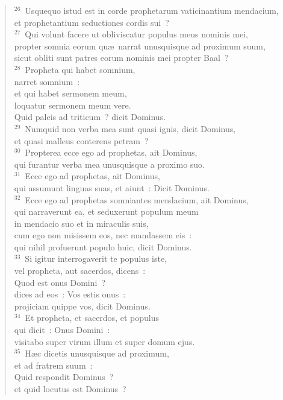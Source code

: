 \begin{flushleft}
\begin{verse}
${}^{26}$~Usquequo istud est in corde prophetarum vaticinantium mendacium,\\ et prophetantium seductiones cordis sui~?\\
${}^{27}$~Qui volunt facere ut obliviscatur populus meus nominis mei,\\ propter somnia eorum qu\ae\ narrat unusquisque ad proximum suum,\\ sicut obliti sunt patres eorum nominis mei propter Baal~?\\
${}^{28}$~Propheta qui habet somnium,\\ narret somnium~:\\ et qui habet sermonem meum,\\ loquatur sermonem meum vere.\\ Quid paleis ad triticum~? dicit Dominus.\\
${}^{29}$~Numquid non verba mea sunt quasi ignis, dicit Dominus,\\ et quasi malleus conterens petram~?\\
${}^{30}$~Propterea ecce ego ad prophetas, ait Dominus,\\ qui furantur verba mea unusquisque a proximo suo.\\
${}^{31}$~Ecce ego ad prophetas, ait Dominus,\\ qui assumunt linguas suas, et aiunt~: Dicit Dominus.\\
${}^{32}$~Ecce ego ad prophetas somniantes mendacium, ait Dominus,\\ qui narraverunt ea, et seduxerunt populum meum\\ in mendacio suo et in miraculis suis,\\ cum ego non misissem eos, nec mandassem eis~:\\ qui nihil profuerunt populo huic, dicit Dominus.\\
${}^{33}$~Si igitur interrogaverit te populus iste,\\ vel propheta, aut sacerdos, dicens~:\\ Quod est onus Domini~?\\ dices ad eos~: Vos estis onus~:\\ projiciam quippe vos, dicit Dominus.\\
${}^{34}$~Et propheta, et sacerdos, et populus\\ qui dicit~: Onus Domini~:\\ visitabo super virum illum et super domum ejus.\\
${}^{35}$~H\ae c dicetis unusquisque ad proximum,\\ et ad fratrem suum~:\\ Quid respondit Dominus~?\\ et quid locutus est Dominus~?\\

\end{verse}
\end{flushleft}

